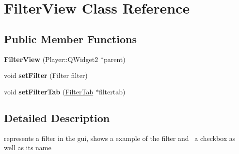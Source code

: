 \hypertarget{classFilterView}{}\section{Filter\+View Class Reference}
\label{classFilterView}
\subsection*{Public Member Functions}
\begin{DoxyCompactItemize}
\item 
\hypertarget{classFilterView_a2c4b13478016a24d65b0b67950ab5bae}{}{\bfseries Filter\+View} (Player\+::\+Q\+Widget2 $\ast$parent)\label{classFilterView_a2c4b13478016a24d65b0b67950ab5bae}

\item 
\hypertarget{classFilterView_aeb29c3a483ea18b78fd613ec61ba29ac}{}void {\bfseries set\+Filter} (Filter filter)\label{classFilterView_aeb29c3a483ea18b78fd613ec61ba29ac}

\item 
\hypertarget{classFilterView_a173fbcd1927e2e97e7738a3880628b4c}{}void {\bfseries set\+Filter\+Tab} (\hyperlink{classFilterTab}{Filter\+Tab} $\ast$filtertab)\label{classFilterView_a173fbcd1927e2e97e7738a3880628b4c}

\end{DoxyCompactItemize}


\subsection{Detailed Description}
represents a filter in the gui, shows a example of the filter and  a checkbox as well as its name 